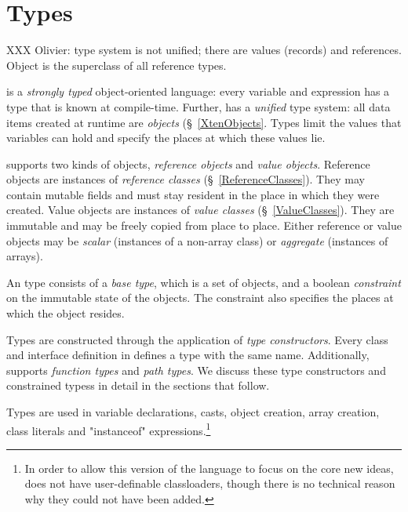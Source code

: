 \chapter{Types}
\label{XtenTypes}

XXX Olivier: type system is not unified; there are values
(records) and references.
Object is the superclass of all reference types.

{}\Xten{} is a {\em strongly typed} object-oriented language: every variable
and expression has a type that is known at compile-time. Further,
\Xten{} has a {\em unified} type system: all data items created at
runtime are {\em objects} (\S~\ref{XtenObjects}. Types limit the
values that variables can hold and specify the places at which these
values lie.

{}\Xten{} supports two kinds of objects, {\em reference objects} and
{\em value objects}.  Reference objects are instances of {\em
reference classes} (\S~\ref{ReferenceClasses}). They may contain
mutable fields and must stay resident in the place in which they were
created. Value objects are instances of {\em value classes}
(\S~\ref{ValueClasses}). They are immutable and may be freely copied
from place to place. Either reference or value objects may be 
{\em scalar} (instances of a non-array class) or {\em aggregate} (instances
of arrays).

An \Xten{} type consists of a {\em base type}, which is a set of
objects, and a boolean {\em constraint} on the immutable state of
the objects.
The constraint also
specifies the places at which the object resides.

\label{TypeConstructors}
Types are constructed through the application of {\em type constructors}.
Every class and interface definition in \Xten{} defines a type with
the same name. Additionally, {}\Xten{} supports {\em function
types}
and {\em path types}.
We discuss these type constructors and constrained typess in detail
in the sections that follow.

Types are used in variable declarations, casts, object creation, array
creation, class literals and \xcd"instanceof" expressions.\footnote{In
order to allow this version of the language to focus on the core new
ideas, \XtenCurrVer{} does not have user-definable classloaders,
though there is no technical reason why they could not have been
added.}



